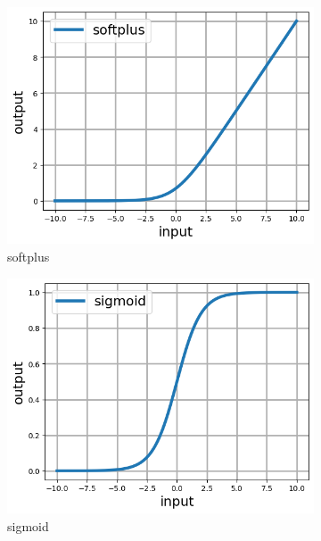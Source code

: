 \documentclass[12pt]{article}
\begin{document}
\begin{figure}[h]
  \centering
  \begin{subfigure}[b]{0.45\linewidth}
    \includegraphics[totalheight=4cm]{Figures/scripts/softplus.png}
    \caption{softplus}
  \end{subfigure}
  \begin{subfigure}[b]{0.45\linewidth}
    \includegraphics[totalheight=4cm]{Figures/scripts/sigmoid.png}
    \caption{sigmoid}
  \end{subfigure}
  \begin{subfigure}[b]{0.45\linewidth}

\end{subfigure}
\end{figure}
\end{document}
